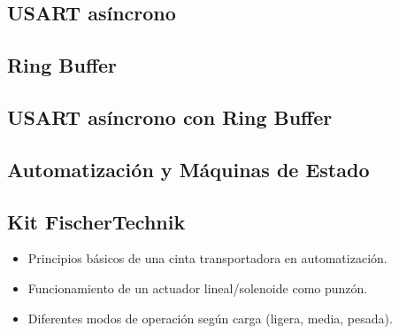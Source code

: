 \subsection{USART asíncrono}

\subsection{Ring Buffer}

\subsection{USART asíncrono con Ring Buffer}

\subsection{Automatización y Máquinas de Estado}

\subsection{Kit FischerTechnik}

\begin{itemize}
    \item Principios básicos de una cinta transportadora en automatización.
    \item Funcionamiento de un actuador lineal/solenoide como punzón.
    \item Diferentes modos de operación según carga (ligera, media, pesada).
\end{itemize}


